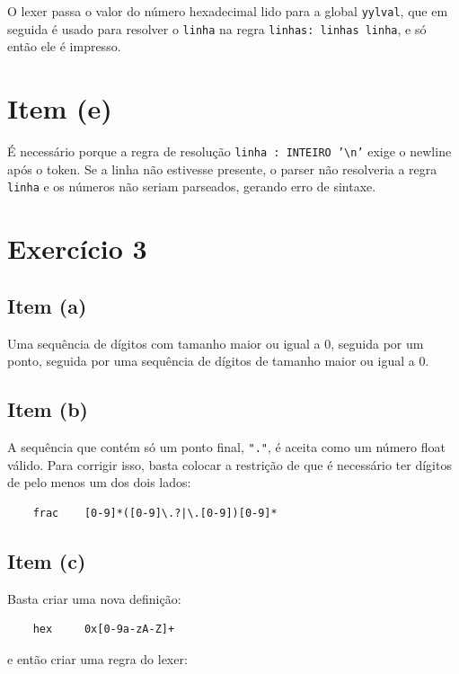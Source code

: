 \documentclass{article}
\begin{document}
O lexer passa o valor do número hexadecimal lido para a global \texttt{yylval}, que em seguida é usado para resolver o \texttt{linha} na regra \texttt{linhas: linhas linha}, e só então ele é impresso.

\section*{Item (e)}

É necessário porque a regra de resolução \texttt{linha : INTEIRO '\textbackslash n'} exige o newline após o token. Se a linha não estivesse presente, o parser não resolveria a regra \texttt{linha} e os números não seriam parseados, gerando erro de sintaxe.

\section*{Exercício 3}

\subsection*{Item (a)}

Uma sequência de dígitos com tamanho maior ou igual a 0, seguida por um ponto, seguida por uma sequência de dígitos de tamanho maior ou igual a 0.

\subsection*{Item (b)}

A sequência que contém só um ponto final, \texttt{"."}, é aceita como um número float válido. Para corrigir isso, basta colocar a restrição de que é necessário ter dígitos de pelo menos um dos dois lados:

\begin{verbatim}
    frac    [0-9]*([0-9]\.?|\.[0-9])[0-9]*
\end{verbatim}

\subsection*{Item (c)}

Basta criar uma nova definição:

\begin{verbatim}
    hex     0x[0-9a-zA-Z]+
\end{verbatim}

e então criar uma regra do lexer:
\end{document}
